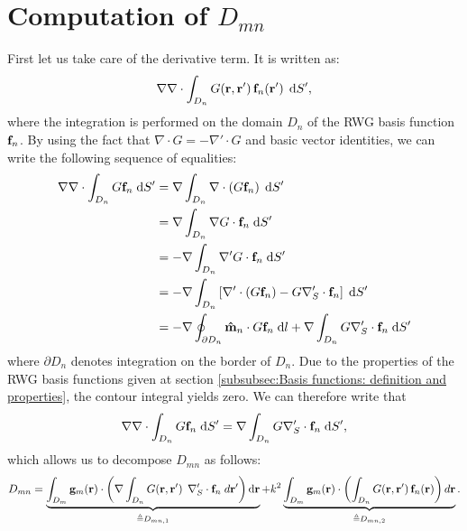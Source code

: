 \section{Computation of $D_{mn}$}
%
\par
First let us take care of the derivative term. It is written as:
\begin{equation}
\nabla \nabla \cdot \int_{D_n} G\!\left(\mathbf{r},\mathbf{r}'\right) \mathbf{f}_n\!\left(\mathbf{r}'\right) \; \text{d} S',
\end{equation}
where the integration is performed on the domain $D_n$ of the RWG basis function $\mathbf{f}_n$. By using the fact that $\nabla \cdot G = -\nabla' \cdot G$ and basic vector identities, we can write the following sequence of equalities:
\begin{equation*}
\begin{split}
\nabla \nabla \cdot \int_{D_n} G \mathbf{f}_n \; \text{d} S' &= \nabla \int_{D_n} \nabla \cdot \left(G \mathbf{f}_n \right) \; \text{d} S' \\
&= \nabla \int_{D_n} \nabla G \cdot \mathbf{f}_n \; \text{d} S' \\
&= -\nabla \int_{D_n} \nabla' G \cdot \mathbf{f}_n \; \text{d} S' \\
&= -\nabla \int_{D_n} \left[\nabla' \cdot \left(G \mathbf{f}_n \right) - G \nabla_S^\prime \cdot \mathbf{f}_n\right]\; \text{d} S'\\
&= -\nabla \oint_{\partial D_n} \mathbf{\Hat{m}}_n \cdot G \mathbf{f}_n \; \text{d} l + \nabla \int_{D_n} G \nabla_S^\prime \cdot \mathbf{f}_n  \; \text{d} S'
\end{split}
\end{equation*}
where $\partial D_n$ denotes integration on the border of $D_n$. Due to the properties of the RWG basis functions given at section \ref{subsubsec:Basis functions: definition and properties}, the contour integral yields zero. We can therefore write that 
\begin{equation}
\nabla \nabla \cdot \int_{D_n} G \mathbf{f}_n \; \text{d} S' = \nabla \int_{D_n} G \nabla_S^\prime \cdot \mathbf{f}_n  \; \text{d} S',
\end{equation}
which allows us to decompose $D_{mn}$ as follows:
\begin{equation}
D_{mn} = \underbrace{\int_{D_m} \mathbf{g}_m\!\left(\mathbf{r}\right) \cdot \left(\nabla \int_{D_n} G\!\left(\mathbf{r},\mathbf{r}'\right) \; \nabla_S^\prime \cdot \mathbf{f}_n  \; d \mathbf{r}'\right) \text{d} \mathbf{r} }_{\triangleq D_{mn,1}} + k^2\underbrace{\int_{D_m}\mathbf{g}_m \!\left(\mathbf{r}\right) \cdot \left( \int_{D_n} G\!\left(\mathbf{r},\mathbf{r}'\right) \mathbf{f}_n\!\left(\mathbf{r}\right)\right) d\mathbf{r}}_{\triangleq D_{mn,2}}.
\end{equation}


